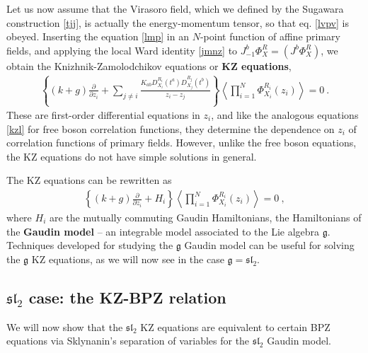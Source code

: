 \documentclass[12pt,a4paper,notitlepage]{report}
\numberwithin{equation}{section}
\theoremstyle{break}
\begin{document}
Let us now assume that the Virasoro field, which we defined by the Sugawara construction \eqref{tjj}, is actually the energy-momentum tensor, so that eq. \eqref{lvpv} is obeyed.
Inserting the equation \eqref{lmp} in an $N$-point function of affine primary fields, and applying the local Ward identity \eqref{jmnz} to $J^b_{-1}\Phi^R_X = (J^b\Phi^R_X)$, we obtain the Knizhnik-Zamolodchikov equations or \textbf{\boldmath KZ equations},
\begin{align}
 \boxed{\left\{(k+g){\frac{\partial}{\partial z_i}} + \sum_{j\neq i} \frac{K_{ab}D_{X_i}^{R_i}(t^a)D_{X_j}^{R_j}(t^b)}{z_i-z_j}\right\}\left\langle \prod_{i=1}^N \Phi^{R_i}_{X_i}(z_i)\right\rangle  = 0}\ .
\label{kz} 
\end{align}
These are first-order differential equations in $z_i$, and like the analogous equations \eqref{kzl} for free boson correlation functions, they determine the dependence on $z_i$ of correlation functions of primary fields.
However, unlike the free boson equations, the KZ equations do not have simple solutions in general. 

The KZ equations can be rewritten as 
\begin{align}
 \left\{(k+g){\frac{\partial}{\partial z_i}} + H_i \right\}\left\langle \prod_{i=1}^N \Phi^{R_i}_{X_i}(z_i)\right\rangle   = 0 \ ,
\label{phz}
\end{align}
where $H_i$ are the mutually commuting Gaudin Hamiltonians, the Hamiltonians of the \textbf{\boldmath Gaudin model} -- an integrable model associated to the Lie algebra $\mathfrak{g}$.
Techniques developed for studying the $\mathfrak{g}$ Gaudin model can be useful for solving the $\mathfrak{g}$ KZ equations, as we will now see in the case $\mathfrak{g} = \mathfrak{sl}_2$. 


\subsection{\texorpdfstring{$\mathfrak{sl}_2$}{sl2} case: the KZ-BPZ relation} 

We will now show that the $\mathfrak{sl}_2$ KZ equations are equivalent to certain BPZ equations via Sklynanin's separation of variables for the $\mathfrak{sl}_2$ Gaudin model. 
\end{document}
